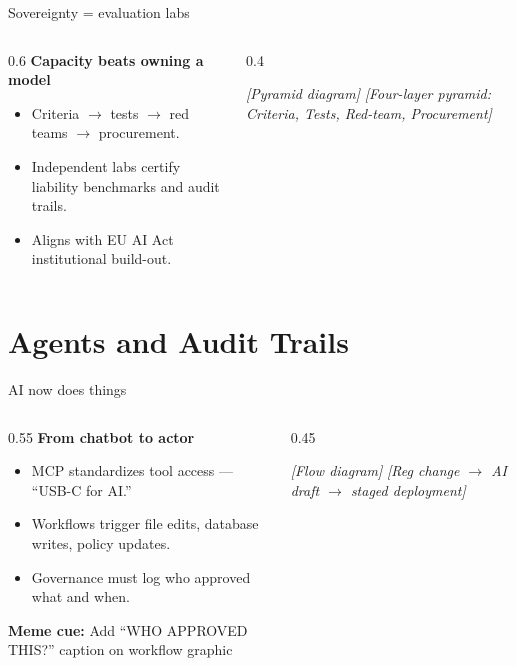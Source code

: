 \documentclass[10pt, aspectratio=169]{beamer}
\newcommand{\placeholder}[1]{\textit{[#1]}}
\newcommand{\memecue}[1]{\textcolor{aauDarkBlue}{\textbf{Meme cue:} #1}}
\begin{document}
\begin{frame}{Sovereignty = evaluation labs}
  \begin{columns}[T]
    \begin{column}{0.6\textwidth}
      \textbf{Capacity beats owning a model}
      \begin{itemize}
        \item Criteria $\rightarrow$ tests $\rightarrow$ red teams $\rightarrow$ procurement.
        \item Independent labs certify liability benchmarks and audit trails.
        \item Aligns with EU AI Act institutional build-out.
      \end{itemize}
    \end{column}
    \begin{column}{0.4\textwidth}
      \begin{block}{\placeholder{Pyramid diagram}}
        \centering
        \placeholder{Four-layer pyramid: Criteria, Tests, Red-team, Procurement}
      \end{block}
    \end{column}
  \end{columns}
  \vfill
  \small \parencite{eu_ai_act_overview,eu_ai_act_timeline}
\end{frame}

\section{Agents and Audit Trails}

\begin{frame}{AI now does things}
  \begin{columns}[T]
    \begin{column}{0.55\textwidth}
      \textbf{From chatbot to actor}
      \begin{itemize}
        \item MCP standardizes tool access --- ``USB-C for AI.''
        \item Workflows trigger file edits, database writes, policy updates.
        \item Governance must log who approved what and when.
      \end{itemize}
      \memecue{Add ``WHO APPROVED THIS?'' caption on workflow graphic}
    \end{column}
    \begin{column}{0.45\textwidth}
      \begin{block}{\placeholder{Flow diagram}}
        \centering
        \placeholder{Reg change $\rightarrow$ AI draft $\rightarrow$ staged deployment}
      \end{block}
    \end{column}
  \end{columns}
  \vfill
  \small \parencite{mcp_site,windows_mcp,copilot_studio_mcp}
\end{frame}
\end{document}

